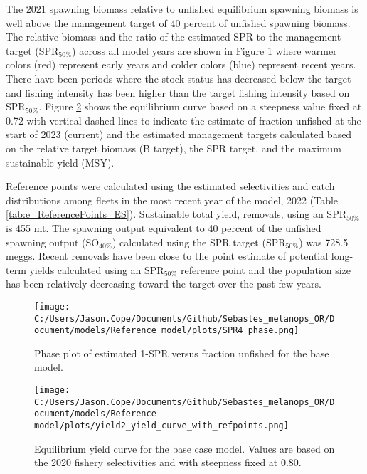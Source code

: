 \documentclass[11pt,
  english,
  letterpaper,
]{article}
\begin{document}
The 2021 spawning biomass relative to unfished equilibrium spawning biomass is well above the management target of 40 percent of unfished spawning biomass. The relative biomass and the ratio of the estimated SPR to the management target (\(\text{SPR}_{50\%}\)) across all model years are shown in Figure \ref{fig:es-phase} where warmer colors (red) represent early years and colder colors (blue) represent recent years. There have been periods where the stock status has decreased below the target and fishing intensity has been higher than the target fishing intensity based on \(\text{SPR}_{50\%}\). Figure \ref{fig:es-yield} shows the equilibrium curve based on a steepness value fixed at 0.72 with vertical dashed lines to indicate the estimate of fraction unfished at the start of 2023 (current) and the estimated management targets calculated based on the relative target biomass (B target), the SPR target, and the maximum sustainable yield (MSY).

Reference points were calculated using the estimated selectivities and catch distributions among fleets in the most recent year of the model, 2022 (Table \ref{tab:e_ReferencePoints_ES}). Sustainable total yield, removals, using an \(\text{SPR}_{50\%}\) is 455 mt. The spawning output equivalent to 40 percent of the unfished spawning output (\(\text{SO}_{40\%}\)) calculated using the SPR target (\(\text{SPR}_{50\%}\)) was 728.5 meggs. Recent removals have been close to the point estimate of potential long-term yields calculated using an \(\text{SPR}_{50\%}\) reference point and the population size has been relatively decreasing toward the target over the past few years.

\begin{figure}
\centering
\texttt{[image: C:/Users/Jason.Cope/Documents/Github/Sebastes\_melanops\_OR/Document/models/Reference model/plots/SPR4\_phase.png]}
\caption{Phase plot of estimated 1-SPR versus fraction unfished for the base model.\label{fig:es-phase}}
\end{figure}

\begin{figure}
\centering
\texttt{[image: C:/Users/Jason.Cope/Documents/Github/Sebastes\_melanops\_OR/Document/models/Reference model/plots/yield2\_yield\_curve\_with\_refpoints.png]}
\caption{Equilibrium yield curve for the base case model. Values are based on the 2020 fishery selectivities and with steepness fixed at 0.80.\label{fig:es-yield}}
\end{figure}
\end{document}
